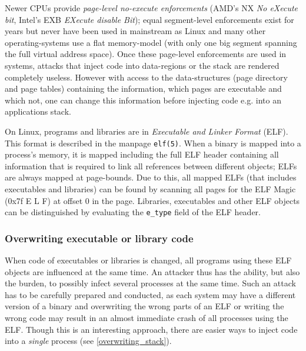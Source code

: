 Newer CPUs provide \emph{page-level no-execute enforcements} (AMD's NX \emph{No
eXecute bit}, Intel's EXB \emph{EXecute disable Bit}); equal segment-level
enforcements exist for years but never have been used in mainstream as Linux and
many other operating-systems use a flat memory-model (with only one big segment
spanning the full virtual address space).  Once these page-level enforcements
are used in systems, attacks that inject code into data-regions or the stack are
rendered completely useless. However with access to the data-structures (page
directory and page tables) containing the information, which pages are
executable and which not, one can change this information before injecting code
e.g. into an applications stack. 

On Linux, programs and libraries are in \emph{Executable and Linker Format}
(ELF).  This format is described in the manpage \texttt{elf(5)}. When a binary
is mapped into a process's memory, it is mapped including the full ELF header
containing all information that is required to link all references between
different objects; ELFs are always mapped at page-bounds. Due to this, all
mapped ELFs (that includes executables and libraries) can be found by scanning
all pages for the ELF Magic (0x7f E L F) at offset $0$ in the page.  Libraries,
executables and other ELF objects can be distinguished by evaluating the
\texttt{e\_type} field of the ELF header.

\subsubsection{Overwriting executable or library code}

When code of executables or libraries is changed, all programs using these ELF
objects are influenced at the same time. An attacker thus has the ability, but
also the burden, to possibly infect several processes at the same time. Such an
attack has to be carefully prepared and conducted, as each system may have a
different version of a binary and overwriting the wrong parts of an ELF or
writing the wrong code may result in an almost immediate crash of all processes
using the ELF. Though this is an interesting approach, there are easier ways to
inject code into a \emph{single} process (see \ref{overwriting_stack}).

